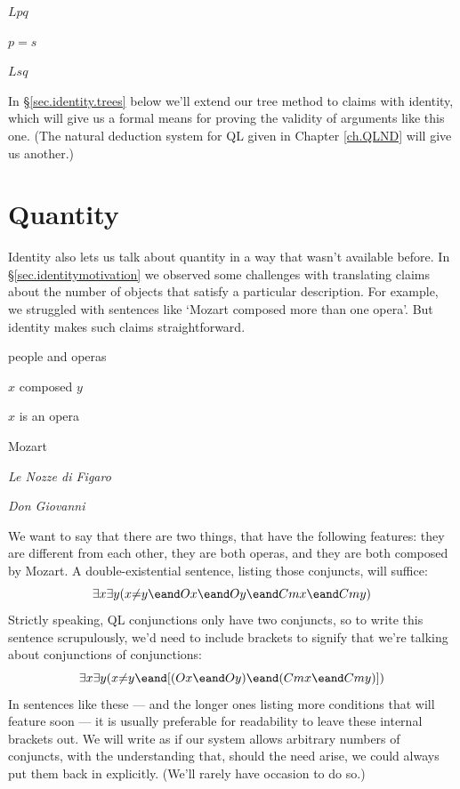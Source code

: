 \begin{earg}
\item[] $Lpq$
\item[] $p{=}s$
\item[\therefore] $Lsq$
\end{earg}

In \S\ref{sec.identity.trees} below we'll extend our tree method to claims with identity, which will give us a formal means for proving the validity of arguments like this one. (The natural deduction system for QL given in Chapter \ref{ch.QLND} will give us another.)





\section{Quantity}
\label{sec.quantity}

Identity also lets us talk about quantity in a way that wasn't available before. In \S\ref{sec.identitymotivation} we observed some challenges with translating claims about the number of objects that satisfy a particular description. For example, we struggled with sentences like `Mozart composed more than one opera'. But identity makes such claims straightforward.

\begin{ekey}
\item[UD:] people and operas
\item[Cxy:] $x$ composed $y$
\item[Ox:] $x$ is an opera
\item[m:] Mozart
\item[n:] \emph{Le Nozze di Figaro}
\item[g:] \emph{Don Giovanni}
\end{ekey}

We want to say that there are two things, that have the following features: they are different from each other, they are both operas, and they are both composed by Mozart. A double-existential sentence, listing those conjuncts, will suffice: 
$$\exists x \exists y (x {\neq} y \eand Ox \eand Oy \eand Cmx \eand Cmy)$$
Strictly speaking, QL conjunctions only have two conjuncts, so to write this sentence scrupulously, we'd need to include brackets to signify that we're talking about conjunctions of conjunctions:
$$\exists x \exists y (x {\neq} y \eand [(Ox \eand Oy) \eand (Cmx \eand Cmy)])$$
In sentences like these --- and the longer ones listing more conditions that will feature soon --- it is usually preferable for readability to leave these internal brackets out. We will write as if our system allows arbitrary numbers of conjuncts, with the understanding that, should the need arise, we could always put them back in explicitly. (We'll rarely have occasion to do so.)

